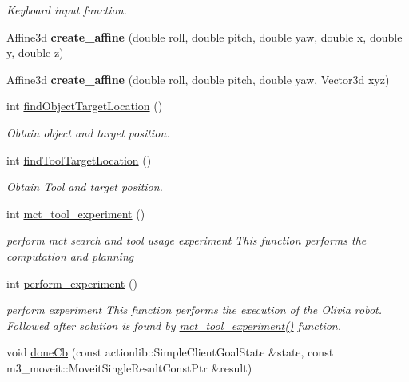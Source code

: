 \begin{DoxyCompactItemize}
\begin{DoxyCompactList}\small\item\em Keyboard input function. \end{DoxyCompactList}\item 
\mbox{\label{structManipulate_a56344962ac193cd9ce322cc0ddf23bac}} 
Affine3d {\bfseries create\+\_\+affine} (double roll, double pitch, double yaw, double x, double y, double z)
\item 
\mbox{\label{structManipulate_a11c5db5c7372d890fa77fae1fc1c6054}} 
Affine3d {\bfseries create\+\_\+affine} (double roll, double pitch, double yaw, Vector3d xyz)
\item 
int \hyperlink{structManipulate_aa8b1c587db98b761dffdcc34a2a2b03c}{find\+Object\+Target\+Location} ()
\begin{DoxyCompactList}\small\item\em Obtain object and target position. \end{DoxyCompactList}\item 
int \hyperlink{structManipulate_aedf7650241c029dd3007e8744796891a}{find\+Tool\+Target\+Location} ()
\begin{DoxyCompactList}\small\item\em Obtain Tool and target position. \end{DoxyCompactList}\item 
int \hyperlink{structManipulate_a0ccd3cd41e0cb39485fe962393e69efd}{mct\+\_\+tool\+\_\+experiment} ()
\begin{DoxyCompactList}\small\item\em perform mct search and tool usage experiment This function performs the computation and planning \end{DoxyCompactList}\item 
int \hyperlink{structManipulate_ae182e793c8a517ba6ff8c2f627dffa43}{perform\+\_\+experiment} ()
\begin{DoxyCompactList}\small\item\em perform experiment This function performs the execution of the Olivia robot. Followed after solution is found by \hyperlink{structManipulate_a0ccd3cd41e0cb39485fe962393e69efd}{mct\+\_\+tool\+\_\+experiment()} function. \end{DoxyCompactList}\item 
void \hyperlink{structManipulate_a159148c2a60da01c497c2a4fe4e76e42}{done\+Cb} (const actionlib\+::\+Simple\+Client\+Goal\+State \&state, const m3\+\_\+moveit\+::\+Moveit\+Single\+Result\+Const\+Ptr \&result)

\end{DoxyCompactItemize}
